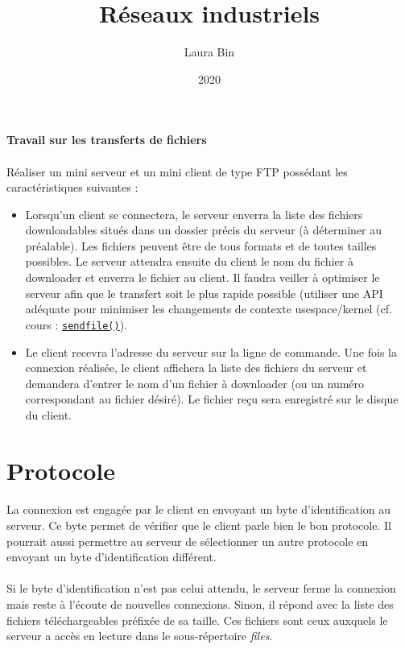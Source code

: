\documentclass{article}
\title{Réseaux industriels}
\date{2020}
\author{Laura Bin}
\begin{document}

    \begin{center}
        \textbf{\LARGE Travail sur les transferts de fichiers}
    \end{center}

    \paragraph{}
    Réaliser un mini serveur et un mini client de type FTP possédant les caractéristiques suivantes :
    \begin{itemize}
        \item Lorsqu’un client se connectera, le serveur enverra la liste des fichiers downloadables situés dans un dossier précis du serveur (à déterminer au préalable). Les fichiers peuvent être de tous formats et de toutes tailles possibles. Le serveur attendra ensuite du client le nom du fichier à downloader et enverra le fichier au client. Il faudra veiller à optimiser le serveur afin que le transfert soit le plus rapide possible (utiliser une API adéquate pour minimiser les changements de contexte usespace/kernel (cf. cours : \href{https://man7.org/linux/man-pages/man2/sendfile.2.html}{\texttt{sendfile()}}).
        \item Le client recevra l’adresse du serveur sur la ligne de commande. Une fois la connexion réalisée, le client affichera la liste des fichiers du serveur et demandera d’entrer le nom d’un fichier à downloader (ou un numéro correspondant au fichier désiré). Le fichier reçu sera enregistré sur le disque du client.
    \end{itemize}

    \section{Protocole}
    \paragraph{}
    La connexion est engagée par le client en envoyant un byte d'identification au serveur. Ce byte permet de vérifier que le client parle bien le bon protocole. Il pourrait aussi permettre au serveur de sélectionner un autre protocole en envoyant un byte d'identification différent.

    \paragraph{}
    Si le byte d'identification n'est pas celui attendu, le serveur ferme la connexion mais reste à l'écoute de nouvelles connexions. Sinon, il répond avec la liste des fichiers téléchargeables préfixée de sa taille. Ces fichiers sont ceux auxquels le serveur a accès en lecture dans le sous-répertoire \emph{files}.
\end{document}
